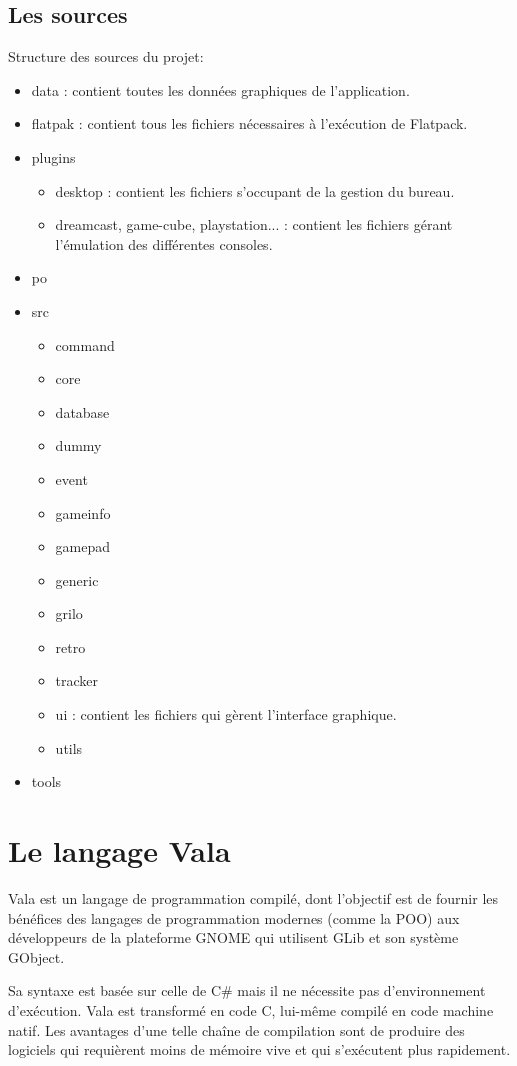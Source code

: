 \documentclass[12pt]{report}
\begin{document}
\subsection{Les sources}
Structure des sources du projet:
\begin{itemize}
\item data : contient toutes les données graphiques de l'application.
\item flatpak : contient tous les fichiers nécessaires à l'exécution de Flatpack.
\item plugins
\begin{itemize}
\item desktop : contient les fichiers s'occupant de la gestion du bureau.
\item dreamcast, game-cube, playstation... :  contient les fichiers gérant l'émulation des différentes consoles.
\end{itemize}
\item po
\item src
\begin{itemize}
\item command
\item core
\item database
\item dummy
\item event
\item gameinfo
\item gamepad
\item generic
\item grilo
\item retro
\item tracker
\item ui : contient les fichiers qui gèrent l'interface graphique.
\item utils
\end{itemize}
\item tools
\end{itemize}

\section{Le langage Vala}
Vala est un langage de programmation compilé, dont l'objectif est de
fournir les bénéfices des langages de programmation modernes (comme la
POO) aux développeurs de la plateforme GNOME qui utilisent GLib et son
système GObject.

Sa syntaxe est basée sur celle de C\# mais il ne nécessite pas
d'environnement d'exécution. Vala est transformé en code C, lui-même
compilé en code machine natif. Les avantages d'une telle chaîne de
compilation sont de produire des logiciels qui requièrent moins de
mémoire vive et qui s'exécutent plus rapidement.
\end{document}

